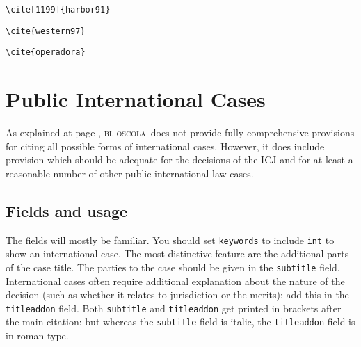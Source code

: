 \documentclass[a4paper,
               11pt,
	       DIV=1,			   
	       footinclude=false]
	      {scrartcl}
\newcommand{\oscola}{\textsc{bl-oscola}}
\newcommand{\egcite}[1]{{\texttt{\textbackslash cite#1}}}
\begin{document}
\begin{description}
\item[\egcite{[1199]\{harbor91\}}] \cite[1199]{harbor91}
\item[\egcite{\{western97\}}] \cite{western97}
\item[\egcite{\{operadora\}}] {\sloppy\cite{operadora09}}
\end{description}

\section{Public International Cases}

As explained at page \pageref{scope}, \oscola\ does not provide
fully comprehensive provisions for citing all possible forms of
international cases. However, it does include provision which should
be adequate for the decisions of the ICJ and for at least a reasonable
number of other public international law cases.

\subsection{Fields and usage}

The fields will mostly be familiar. You should set \texttt{keywords}
to include \texttt{int} to show an international case. The most
distinctive feature are the additional parts of the case title. The
parties to the case should be given in the \texttt{subtitle}
field.
International cases often require additional explanation about
the nature of the decision (such as whether it relates to jurisdiction
or the merits): add this in the \texttt{titleaddon} field. Both
\texttt{subtitle} and \texttt{titleaddon} get printed in brackets
after the main citation: but whereas the \texttt{subtitle} field is
italic, the \texttt{titleaddon} field is in roman type.
\end{document}
